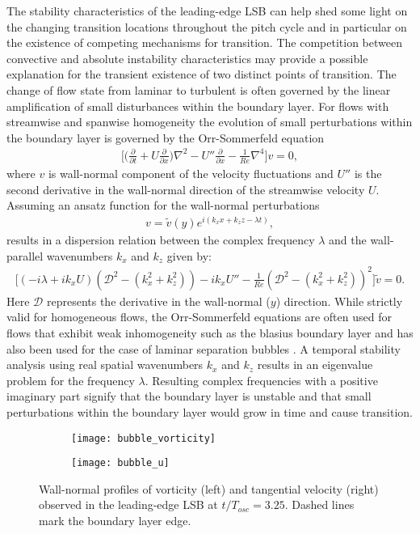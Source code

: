 The stability characteristics of the leading-edge LSB can help shed some light on the changing transition locations throughout the pitch cycle and in particular on the existence of competing mechanisms for transition. The competition between convective and absolute instability characteristics may provide a possible explanation for the transient existence of two distinct points of transition. The change of flow state from laminar to turbulent is often governed by the linear amplification of small disturbances within the boundary layer. For flows with streamwise and spanwise homogeneity the evolution of small perturbations within the boundary layer is governed by the Orr-Sommerfeld equation
\begin{align}
	\bigg[\big(\frac{\partial}{\partial t} + U\frac{\partial}{\partial x}\big)\nabla^{2} - U''\frac{\partial}{\partial x} - \frac{1}{Re}\nabla^{4}	\bigg]v = 0,
\end{align}
where $v$ is wall-normal component of the velocity fluctuations and $U''$ is the second derivative in the wall-normal direction of the streamwise velocity $U$. Assuming an ansatz function for the wall-normal perturbations
\begin{align}
	v = \tilde{v}(y)e^{i(k_{x}x + k_{z}z - \lambda t)},
\end{align}	
results in a dispersion relation between the complex frequency $\lambda$ and the wall-parallel wavenumbers $k_{x}$ and $k_{z}$ given by:
\begin{align}
	\bigg[(-i\lambda + ik_{x}U)(\mathcal{D}^{2} - (k_{x}^{2} + k_{z}^2)) - ik_{x}U'' - \frac{1}{Re}(\mathcal{D}^{2} - (k_{x}^2 + k_{z}^2))^{2}\bigg]\tilde{v} = 0.
	\label{eqn:orr-somerfeld}
\end{align}
Here $\mathcal{D}$ represents the derivative in the wall-normal ($y$) direction. While strictly valid for homogeneous flows, the Orr-Sommerfeld equations are often used for flows that exhibit weak inhomogeneity such as the blasius boundary layer and has also been used for the case of laminar separation bubbles \citep{alam00,hammond98,haggmark01b}. A temporal stability analysis using real spatial wavenumbers $k_{x}$ and $k_{z}$ results in an eigenvalue problem for the frequency $\lambda$. Resulting complex frequencies with a positive imaginary part signify that the boundary layer is unstable and that small perturbations within the boundary layer would grow in time and cause transition. 
\begin{figure}[h]
	\centering
	\begin{subfigure}[t]{0.48\textwidth}
		\centering
		\texttt{[image: bubble\_vorticity]}
	\end{subfigure}
	\begin{subfigure}[t]{0.48\textwidth}
		\centering
		\texttt{[image: bubble\_u]}
	\end{subfigure}
	\caption{Wall-normal profiles of vorticity (left) and tangential velocity (right) observed in the leading-edge LSB at $t/T_{osc}=3.25$. Dashed lines mark the boundary layer edge.}
	\label{fig:bubble_profiles}
\end{figure}

